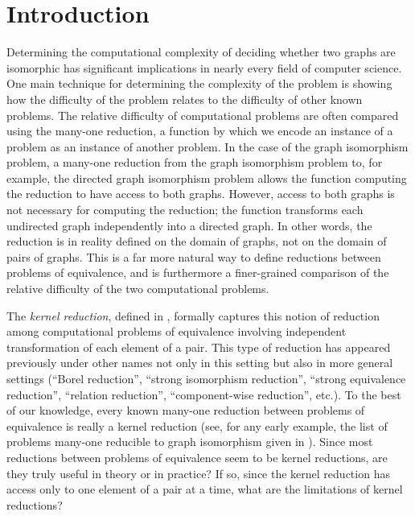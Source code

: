 \section{Introduction}

Determining the computational complexity of deciding whether two graphs are isomorphic has significant implications in nearly every field of computer science.
One main technique for determining the complexity of the problem is showing how the difficulty of the problem relates to the difficulty of other known problems.
The relative difficulty of computational problems are often compared using the many-one reduction, a function by which we encode an instance of a problem as an instance of another problem.
In the case of the graph isomorphism problem, a many-one reduction from the graph isomorphism problem to, for example, the directed graph isomorphism problem allows the function computing the reduction to have access to both graphs.
However, access to both graphs is not necessary for computing the reduction; the function transforms each undirected graph independently into a directed graph.
In other words, the reduction is in reality defined on the domain of graphs, not on the domain of pairs of graphs.
This is a far more natural way to define reductions between problems of equivalence, and is furthermore a finer-grained comparison of the relative difficulty of the two computational problems.

The \emph{kernel reduction}, defined in \autocite[Definition~4.13]{fg09}, formally captures this notion of reduction among computational problems of equivalence involving independent transformation of each element of a pair.
This type of reduction has appeared previously under other names not only in this setting but also in more general settings (``Borel reduction'', ``strong isomorphism reduction'', ``strong equivalence reduction'', ``relation reduction'', ``component-wise reduction'', etc.).
To the best of our knowledge, every known many-one reduction between problems of equivalence is really a kernel reduction (see, for any early example, the list of problems many-one reducible to graph isomorphism given in \autocite{bc79}).
Since most reductions between problems of equivalence seem to be kernel reductions, are they truly useful in theory or in practice?
If so, since the kernel reduction has access only to one element of a pair at a time, what are the limitations of kernel reductions?

